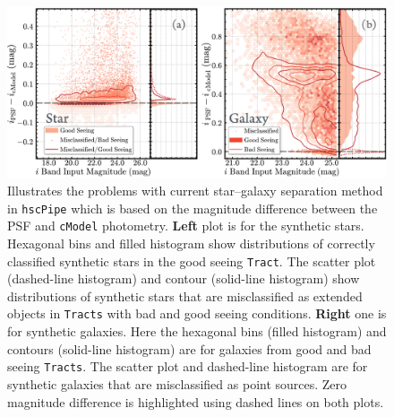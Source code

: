 \documentclass[useamsfonts]{pasj01}
\def\hscpipe{\texttt{hscPipe}}
\def\cmodel{\texttt{cModel}}
\def\tract{\texttt{Tract}}
\def\tracts{\texttt{Tracts}}
\begin{document}
\begin{figure}
    \begin{center}
        \includegraphics[width=\textwidth]{fig/synpipe_star_galaxy}
    \end{center}
    \caption{
        Illustrates the problems with current star--galaxy separation method in
        \hscpipe{} which is based on the magnitude difference between the PSF and
        \cmodel{} photometry.
        \textbf{Left} plot is for the synthetic stars.
        Hexagonal bins and filled histogram show distributions of correctly classified
        synthetic stars in the good seeing \tract{}.
        The scatter plot (dashed-line histogram) and contour (solid-line histogram)
        show distributions of synthetic stars that are misclassified as extended
        objects in \tracts{} with bad and good seeing conditions.
        \textbf{Right} one is for synthetic galaxies.
        Here the hexagonal bins (filled histogram) and contours (solid-line histogram)
        are for galaxies from good and bad seeing \tracts{}.
        The scatter plot and dashed-line histogram are for synthetic galaxies that are
        misclassified as point sources.
        Zero magnitude difference is highlighted using dashed lines on both plots.
        }
    \label{fig:sg}
\end{figure}
\end{document}
